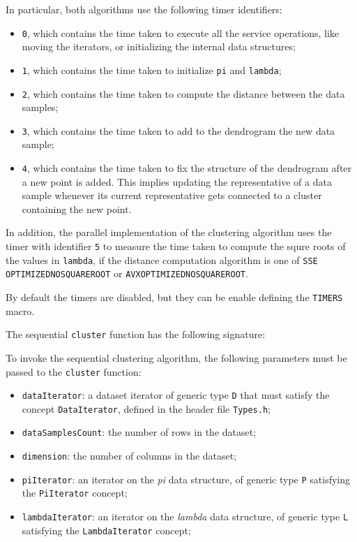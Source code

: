 \documentclass{article}
\begin{document}
In particular, both algorithms use the following timer identifiers:
\begin{itemize}
    \item \texttt{0}, which contains the time taken to execute all the service operations, like
    moving the iterators, or initializing the internal data structures;
    \item \texttt{1}, which contains the time taken to initialize \texttt{pi} and \texttt{lambda};
    \item \texttt{2}, which contains the time taken to compute the distance between the data
    samples;
    \item \texttt{3}, which contains the time taken to add to the dendrogram the new data sample;
    \item \texttt{4}, which contains the time taken to fix the structure of the dendrogram after
    a new point is added. This implies updating the representative of a data sample whenever its
    current representative gets connected to a cluster containing the new point.
\end{itemize}

In addition, the parallel implementation of the clustering algorithm uses the timer with identifier
\texttt{5} to measure the time taken to compute the squre roots of the values in \texttt{lambda},
if the distance computation algorithm is one of \texttt{SSE\textunderscore
OPTIMIZED\textunderscore NO\textunderscore SQUARE\textunderscore ROOT} or
\texttt{AVX\textunderscore OPTIMIZED\textunderscore NO\textunderscore SQUARE\textunderscore ROOT}.

By default the timers are disabled, but they can be enable defining the \texttt{TIMERS} macro.
%
%
%
%
%
%
%
%
\clearpage

The sequential \texttt{cluster} function has the following signature:

To invoke the sequential clustering algorithm, the following parameters
must be passed to the \texttt{cluster} function:

\begin{itemize}
    
    \item
    \texttt{dataIterator}: a dataset iterator of generic type \texttt{D}
    that must satisfy the concept \texttt{DataIterator}, defined in the
    header file \texttt{Types.h};
    \item
    \texttt{dataSamplesCount}: the number of rows in the dataset;
    \item
    \texttt{dimension}: the number of columns in the dataset;
    \item
    \texttt{piIterator}: an iterator on the \emph{pi} data structure, of
    generic type \texttt{P} satisfying the \texttt{PiIterator} concept;
    \item
    \texttt{lambdaIterator}: an iterator on the \emph{lambda} data
    structure, of generic type \texttt{L} satisfying the
    \texttt{LambdaIterator} concept;
\end{itemize}
\end{document}

